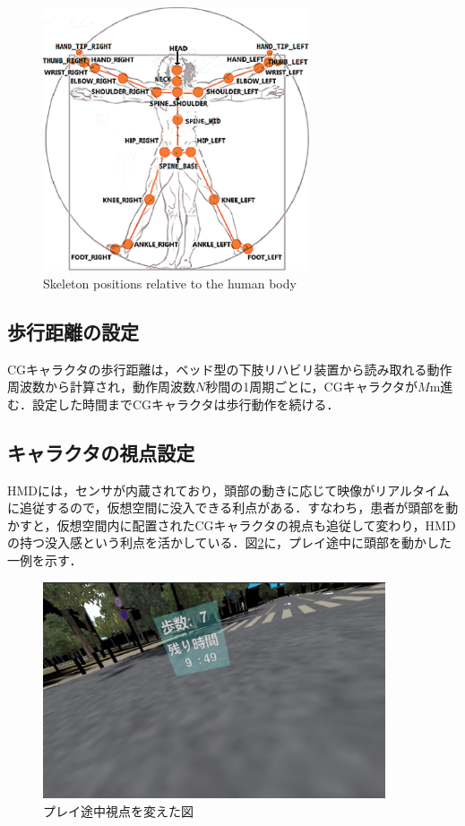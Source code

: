 \begin{figure}[tbp]
	\centering
			\includegraphics[width=0.7\textwidth]{chap2-figure/skelton_position.eps}
	\caption{Skeleton positions relative to the human body}
	\label{fig:skelton_position}
\end{figure}


\subsection{歩行距離の設定}
CGキャラクタの歩行距離は，ベッド型の下肢リハビリ装置から読み取れる動作周波数から計算され，動作周波数$N$秒間の1周期ごとに，CGキャラクタが$M$m進む．設定した時間までCGキャラクタは歩行動作を続ける．

\subsection{キャラクタの視点設定}
HMDには，センサが内蔵されており，頭部の動きに応じて映像がリアルタイムに追従するので，仮想空間に没入できる利点がある．すなわち，患者が頭部を動かすと，仮想空間内に配置されたCGキャラクタの視点も追従して変わり，HMDの持つ没入感という利点を活かしている．図\ref{fig:geammidstream}に，プレイ途中に頭部を動かした一例を示す．

\begin{figure}[tbp]
	\centering
			\includegraphics[width=0.9\textwidth]{chap2-figure/midstream-2.eps}
	\caption{プレイ途中視点を変えた図}
	\label{fig:geammidstream}
\end{figure}
\fi

